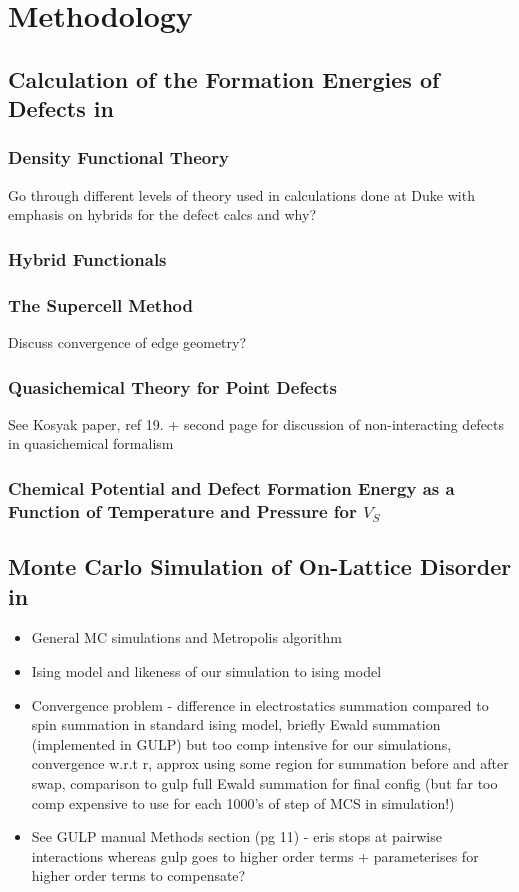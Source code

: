 \chapter{Methodology}

\section{Calculation of the Formation Energies of Defects in \CZTS}
\subsection{Density Functional Theory}
Go through different levels of theory used in calculations done at Duke with emphasis on hybrids for the defect calcs and why?

\subsection{Hybrid Functionals}
\subsection{The Supercell Method}
Discuss convergence of edge geometry?

\subsection{Quasichemical Theory for Point Defects}
See Kosyak paper, ref 19. + second page for discussion of non-interacting defects in quasichemical formalism

\subsection{Chemical Potential and Defect Formation Energy as a Function of Temperature and Pressure for $V_S$}

\section{Monte Carlo Simulation of On-Lattice Disorder  in \CZTS}
\begin{itemize}
\item General MC simulations and Metropolis algorithm
\item Ising model and likeness of our simulation to ising model
\item Convergence problem - difference in electrostatics summation compared to spin summation in standard ising model, briefly Ewald summation (implemented in GULP) but too comp intensive for our simulations, convergence w.r.t r, approx using some region for summation before and after swap, comparison to gulp full Ewald summation for final config (but far too comp expensive to use for each 1000's of  step of MCS in simulation!)
\item See GULP manual Methods section (pg 11) - eris stops at pairwise interactions whereas gulp goes to higher order terms + parameterises for higher order terms to compensate?
\end{itemize}

